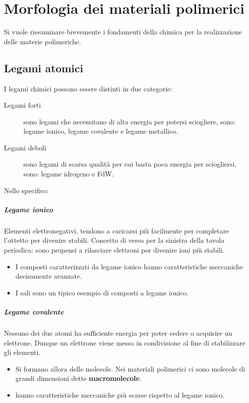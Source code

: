 \chapter{Morfologia dei materiali polimerici}\label{ch:Morfologia}
Si vuole riesaminare brevemente i fondamenti della chimica per la realizzazione delle materie polimeriche.
\section{Legami atomici}
I legami chimici possono essere distinti in due categorie:
\begin{description}
\item[Legami forti] sono legami che necessitano di alta energia per potersi sciogliere, sono: legame ionico, legame covalente e legame metallico.
\item[Legami deboli] sono legami di scarsa qualità per cui basta poca energia per sciogliersi, sono: legame idrogeno e \ac{FdW}.
\end{description}
Nello specifico:

\paragraph{Legame ionico} Elementi elettronegativi, tendono a caricarsi più facilmente per completare l'ottetto per divenire stabili. Concetto di verso per la sinistra della tavola periodica: sono propensi a rilasciare elettroni per divenire ioni più stabili.
\begin{itemize}
\item I composti caratterizzati da legame ionico hanno caratteristiche meccaniche decisamente avanzate.
\item I sali sono un tipico esempio di composti a legame ionico.
\end{itemize}

\paragraph{Legame covalente} Nessuno dei due atomi ha sufficiente energia per poter cedere o acquisire un elettrone. Dunque un elettrone viene messo in condivisione al fine di stabilizzare gli elementi.
\begin{itemize}
\item Si formano allora delle molecole. Nei materiali polimerici ci sono molecole di grandi dimensioni dette \textbf{macromolecole}.
\item hanno caratteristiche meccaniche più scarse rispetto al legame ionico.
\end{itemize}

